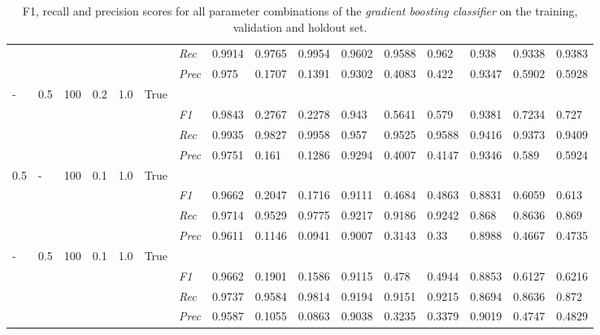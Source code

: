 \begin{table}[H]
\begin{tabularx}{\textwidth}{XXXXXX|X|XXX|XXX|XXX}
    & & & & & & \textit{Rec} & 0.9914 & 0.9765 & 0.9954    & 0.9602 & 0.9588    & 0.962    & 0.938    & 0.9338    & 0.9383    \\
    & & & & & & \textit{Prec} & 0.975 & 0.1707 & 0.1391 & 0.9302 & 0.4083 & 0.422 & 0.9347 & 0.5902 & 0.5928 \\ \midrule
    - & 0.5 & 100 & 0.2 & 1.0 &True & & & & & & & & & \\
    & & & & & & \textit{F1} & 0.9843 & 0.2767 & 0.2278 & 0.943 & 0.5641        & 0.579        & 0.9381        & 0.7234        & 0.727        \\
    & & & & & & \textit{Rec} & 0.9935 & 0.9827 & 0.9958    & 0.957 & 0.9525    & 0.9588    & 0.9416    & 0.9373    & 0.9409    \\
    & & & & & & \textit{Prec} & 0.9751 & 0.161 & 0.1286 & 0.9294 & 0.4007 & 0.4147 & 0.9346 & 0.589 & 0.5924 \\ \midrule
    0.5 & - & 100 & 0.1 & 1.0 &True & & & & & & & & & \\
    & & & & & & \textit{F1} & 0.9662 & 0.2047 & 0.1716 & 0.9111 & 0.4684        & 0.4863        & 0.8831        & 0.6059        & 0.613        \\
    & & & & & & \textit{Rec} & 0.9714 & 0.9529 & 0.9775    & 0.9217 & 0.9186    & 0.9242    & 0.868    & 0.8636    & 0.869    \\
    & & & & & & \textit{Prec} & 0.9611 & 0.1146 & 0.0941 & 0.9007 & 0.3143 & 0.33 & 0.8988 & 0.4667 & 0.4735 \\ \midrule
    - & 0.5 & 100 & 0.1 & 1.0 &True & & & & & & & & & \\
    & & & & & & \textit{F1} & 0.9662 & 0.1901 & 0.1586 & 0.9115 & 0.478        & 0.4944        & 0.8853        & 0.6127        & 0.6216        \\
    & & & & & & \textit{Rec} & 0.9737 & 0.9584 & 0.9814    & 0.9194 & 0.9151    & 0.9215    & 0.8694    & 0.8636    & 0.872    \\
    & & & & & & \textit{Prec} & 0.9587 & 0.1055 & 0.0863 & 0.9038 & 0.3235 & 0.3379 & 0.9019 & 0.4747 & 0.4829 \\ \midrule
    \end{tabularx}
    \caption{F1, recall and precision scores for all parameter combinations of the \textit{gradient boosting classifier} on the training, validation and holdout set. }
    \label{tab:all_results_gradient_boosting_classifier}
    \end{table}
    
